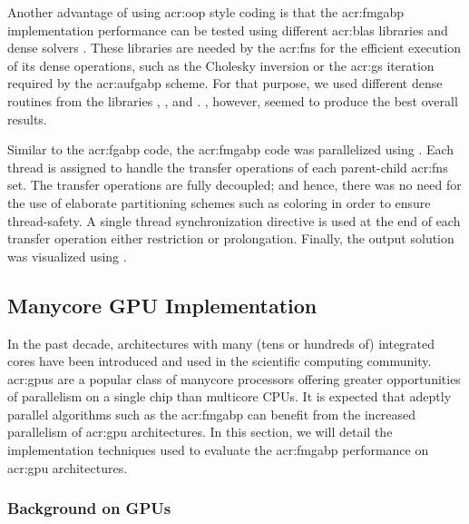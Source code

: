 Another advantage of using \gls{acr:oop} style coding is that the \gls{acr:fmgabp} implementation performance can be tested using different \gls{acr:blas} libraries and dense solvers \cite{bib:blas,bib:blasDongarra:2002,bib:lapack}.
These libraries are needed by the \glspl{acr:fn} for the efficient execution of its dense operations, such as the Cholesky inversion or the \gls{acr:gs} iteration required by the \gls{acr:aufgabp} scheme.
For that purpose, we used different dense routines from the libraries \dealName{},  \cite{bib:gmm}, and  \cite{bib:eigen}.
, however, seemed to produce the best overall results.


Similar to the \gls{acr:fgabp} code, the \gls{acr:fmgabp} code was parallelized using  \cite{bib:openmp}.
Each thread is assigned to handle the transfer operations of each parent-child \glspl{acr:fn} set.
The transfer operations are fully decoupled; and hence, there was no need for the use of elaborate partitioning schemes such as coloring in order to ensure thread-safety.
A single thread synchronization directive is used at the end of each transfer operation either restriction or prolongation.
Finally, the output solution was visualized using  \cite{bib:paraview}.



\subsection{Manycore GPU Implementation}

In the past decade, architectures with many (tens or hundreds of) integrated cores have been introduced and used in the scientific computing community.
\Glspl{acr:gpu} are a popular class of manycore processors offering greater opportunities of parallelism on a single chip than multicore CPUs.
It is expected that adeptly parallel algorithms such as the \gls{acr:fmgabp} can benefit from the increased parallelism of \gls{acr:gpu} architectures.
In this section, we will detail the implementation techniques used to evaluate the \gls{acr:fmgabp} performance on \gls{acr:gpu} architectures.

\subsubsection{Background on GPUs}

